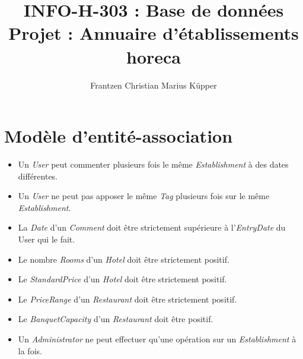 \documentclass[11pt,a4paper]{report}
\author{Frantzen Christian Marius Küpper}
\title{INFO-H-303 : Base de données\\
		Projet : Annuaire d'établissements horeca}
\begin{document}
\maketitle
\section*{Modèle d'entité-association}

\begin{itemize}
\item Un \textit{User} peut commenter plusieurs fois le même \textit{Establishment} à des dates différentes. 
\item Un \textit{User} ne peut pas apposer le même \textit{Tag} plusieurs fois sur le même \textit{Establishment}. 
\item La \textit{Date} d'un \textit{Comment} doit être strictement supérieure à l'\textit{EntryDate} du User qui le fait. 
\item Le nombre \textit{Rooms} d'un \textit{Hotel} doit être strictement positif. 
\item Le \textit{StandardPrice} d'un \textit{Hotel} doit être strictement positif. 
\item Le \textit{PriceRange} d'un \textit{Restaurant} doit être strictement positif. 
\item Le \textit{BanquetCapacity} d'un \textit{Restaurant} doit être positif. 
\item Un \textit{Administrator} ne peut effectuer qu'une opération sur un \textit{Establishment} à la fois. 
\end{itemize}
\end{document}
